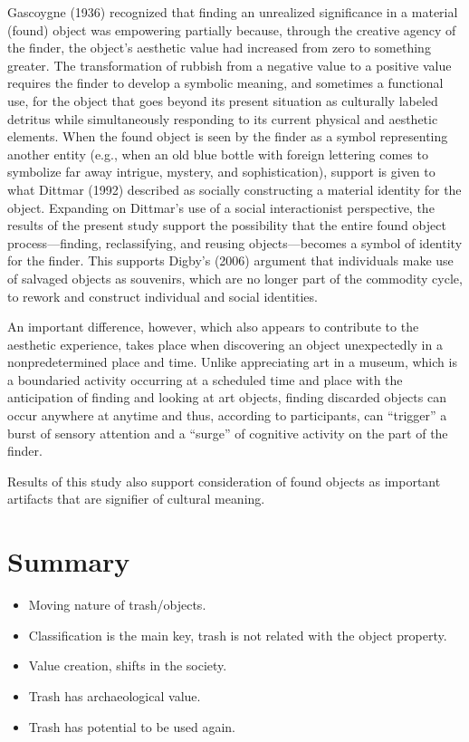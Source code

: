 Gascoygne (1936) recognized that finding an unrealized significance in a material (found) object was empowering partially because, through the creative agency of the finder, the object’s aesthetic value had increased from zero to something greater. The transformation of rubbish from a negative value to a positive value requires the finder to develop a symbolic meaning, and sometimes a functional use, for the object that goes beyond its present situation as culturally labeled detritus while simultaneously responding to its current physical and aesthetic elements. When the found object is seen by the finder as a symbol representing another entity (e.g., when an old blue bottle with foreign lettering comes to symbolize far away intrigue, mystery, and sophistication), support is given to what Dittmar (1992) described as socially constructing a material identity for the object. Expanding on Dittmar’s use of a social interactionist perspective, the results of the present study support the possibility that the entire found object process---finding, reclassifying, and reusing objects---becomes a symbol of identity for the finder. This supports Digby’s (2006) argument that individuals make use of salvaged objects as souvenirs, which are no longer part of the commodity cycle, to rework and construct individual and social identities.

An important difference, however, which also appears to contribute to the aesthetic experience, takes place when discovering an object unexpectedly in a nonpredetermined place and time. Unlike appreciating art in a museum, which is a boundaried activity occurring at a scheduled time and place with the anticipation of finding and looking at art objects, finding discarded objects can occur anywhere at anytime and thus, according to participants, can “trigger” a burst of sensory attention and a “surge” of cognitive activity on the part of the finder. 

Results of this study also support consideration of found objects as important artifacts that are signifier of cultural meaning.


\section{Summary}
\begin{itemize}
\item Moving nature of trash/objects.
\item Classification is the main key, trash is not related with the object property. 
\item Value creation, shifts in the society. 
\item Trash has archaeological value.
\item Trash has potential to be used again.
\end{itemize}

